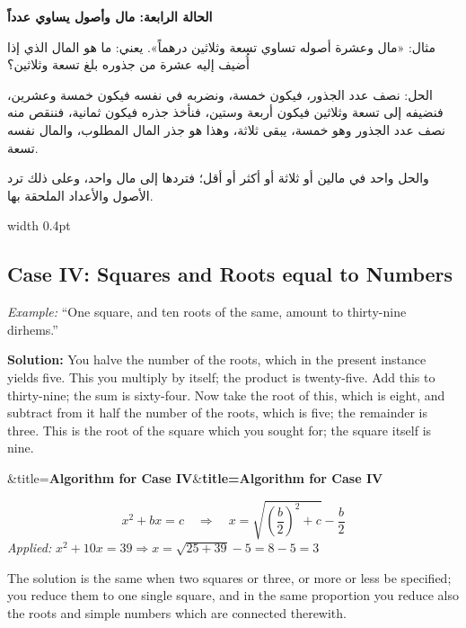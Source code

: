 \documentclass[11pt,a4paper]{book}
\newenvironment{mathbox}[1][]{%
  \smallskip\par\noindent
  \begin{lrbox}{\mathboxsave}
  \begin{minipage}{\dimexpr\linewidth-2\fboxsep-2\fboxrule\relax}%
  \setlength{\parskip}{0.3em}%
  \ifx&#1&\else\textbf{#1}\\[0.2cm]\fi
}{%
  \end{minipage}%
  \end{lrbox}
  \fcolorbox{sectioncolor}{mathbg}{\usebox{\mathboxsave}}%
  \smallskip}
\begin{document}
\noindent\begin{minipage}[t]{0.48\textwidth}
\raggedleft

\begin{Arabic}
\textbf{الحالة الرابعة: مال وأصول يساوي عدداً}

مثال: «مال وعشرة أصوله تساوي تسعة وثلاثين درهماً». يعني: ما هو المال الذي إذا أُضيف إليه عشرة من جذوره بلغ تسعة وثلاثين؟

الحل: نصف عدد الجذور، فيكون خمسة، ونضربه في نفسه فيكون خمسة وعشرين، فنضيفه إلى تسعة وثلاثين فيكون أربعة وستين، فنأخذ جذره فيكون ثمانية، فننقص منه نصف عدد الجذور وهو خمسة، يبقى ثلاثة، وهذا هو جذر المال المطلوب، والمال نفسه تسعة.

والحل واحد في مالين أو ثلاثة أو أكثر أو أقل؛ فتردها إلى مال واحد، وعلى ذلك ترد الأصول والأعداد الملحقة بها.
\end{Arabic}

\end{minipage}%
\hfill\vrule width 0.4pt\hfill
\begin{minipage}[t]{0.48\textwidth}
\raggedright

\subsection*{Case IV: Squares and Roots equal to Numbers}

\textit{Example:} ``One square, and ten roots of the same, amount to thirty-nine dirhems.''

\textbf{Solution:} You halve the number of the roots, which in the present instance yields five. This you multiply by itself; the product is twenty-five. Add this to thirty-nine; the sum is sixty-four. Now take the root of this, which is eight, and subtract from it half the number of the roots, which is five; the remainder is three. This is the root of the square which you sought for; the square itself is nine.

\begin{mathbox}[title={\textbf{Algorithm for Case IV}}]
\begin{equation}
x^2 + bx = c \quad\Longrightarrow\quad x = \sqrt{\left(\frac{b}{2}\right)^2 + c} - \frac{b}{2}
\end{equation}
\textit{Applied:} $x^2 + 10x = 39 \Rightarrow x = \sqrt{25 + 39} - 5 = 8 - 5 = 3$
\end{mathbox}

The solution is the same when two squares or three, or more or less be specified; you reduce them to one single square, and in the same proportion you reduce also the roots and simple numbers which are connected therewith.

\end{minipage}
\vspace{0.3cm}
\end{document}
